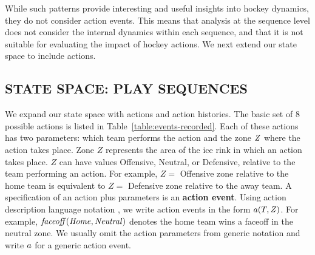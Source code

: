 \documentclass[]{article}
\begin{document}
\begin{enumerate}
\end{enumerate}

While such patterns provide interesting and useful insights into hockey dynamics, they do not consider action events. This means that analysis at the sequence level does not consider the internal dynamics within each sequence, and that it is not suitable for evaluating the impact of hockey actions. We next extend our state space to include actions.

\subsection{STATE SPACE: PLAY SEQUENCES}
\label{subsec:play-sequences}

We expand our state space with actions and action histories. The basic set of 8 possible actions is listed in Table~\ref{table:events-recorded}. Each of these actions has two parameters: which team performs the action and the zone $\it{Z}$ where the action takes place. Zone $Z$ represents the area of the ice rink in which an action takes place. $Z$ can have values Offensive, Neutral, or Defensive, relative to the team performing an action. For example, $Z = $ Offensive zone relative to the home team is equivalent to $Z = $ Defensive zone relative to the away team. A specification of an action plus parameters is an \textbf{action event}. Using action description language notation \citep{bib:LevesquePirriReiter98}, we write action events in the form $a(T,\it{Z})$. For example, $\it{faceoff}(\it{Home},\it{Neutral})$ denotes the home team wins a faceoff in the neutral zone. We usually omit the action parameters from generic notation and write $a$ for a generic action event.
\end{document}
